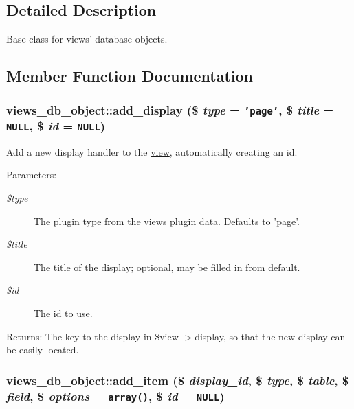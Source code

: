 \subsection{Detailed Description}
Base class for views' database objects. 

\subsection{Member Function Documentation}
\hypertarget{classviews__db__object_6e9c2b7bb3d5670fefde14518a38de95}{
\subsubsection[{add\_\-display}]{\setlength{\rightskip}{0pt plus 5cm}views\_\-db\_\-object::add\_\-display (\$ {\em type} = {\tt 'page'}, \/  \$ {\em title} = {\tt NULL}, \/  \$ {\em id} = {\tt NULL})}}
\label{classviews__db__object_6e9c2b7bb3d5670fefde14518a38de95}


Add a new display handler to the \hyperlink{classview}{view}, automatically creating an id.

\begin{Desc}
\item[Parameters:]
\begin{description}
\item[{\em \$type}]The plugin type from the views plugin data. Defaults to 'page'. \item[{\em \$title}]The title of the display; optional, may be filled in from default. \item[{\em \$id}]The id to use. \end{description}
\end{Desc}
\begin{Desc}
\item[Returns:]The key to the display in \$view-$>$display, so that the new display can be easily located. \end{Desc}
\hypertarget{classviews__db__object_794e8375c5d243e52645675b31251ccc}{
\subsubsection[{add\_\-item}]{\setlength{\rightskip}{0pt plus 5cm}views\_\-db\_\-object::add\_\-item (\$ {\em display\_\-id}, \/  \$ {\em type}, \/  \$ {\em table}, \/  \$ {\em field}, \/  \$ {\em options} = {\tt array()}, \/  \$ {\em id} = {\tt NULL})}}
\label{classviews__db__object_794e8375c5d243e52645675b31251ccc}


